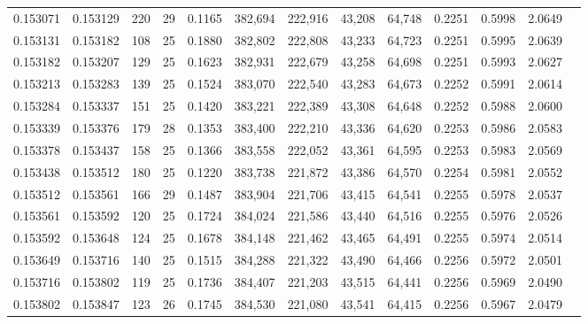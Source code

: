 \begin{tabular}{rrrrrrrrrrrrr}
0.153071 & 0.153129 & 220 &  29 &                                     0.1165 & 382,694 & 222,916 &  43,208 &  64,748 & 0.2251 & 0.5998 & 2.0649 \\
0.153131 & 0.153182 & 108 &  25 &                                     0.1880 & 382,802 & 222,808 &  43,233 &  64,723 & 0.2251 & 0.5995 & 2.0639 \\
0.153182 & 0.153207 & 129 &  25 &                                     0.1623 & 382,931 & 222,679 &  43,258 &  64,698 & 0.2251 & 0.5993 & 2.0627 \\
0.153213 & 0.153283 & 139 &  25 &                                     0.1524 & 383,070 & 222,540 &  43,283 &  64,673 & 0.2252 & 0.5991 & 2.0614 \\
0.153284 & 0.153337 & 151 &  25 &                                     0.1420 & 383,221 & 222,389 &  43,308 &  64,648 & 0.2252 & 0.5988 & 2.0600 \\
0.153339 & 0.153376 & 179 &  28 &                                     0.1353 & 383,400 & 222,210 &  43,336 &  64,620 & 0.2253 & 0.5986 & 2.0583 \\
0.153378 & 0.153437 & 158 &  25 &                                     0.1366 & 383,558 & 222,052 &  43,361 &  64,595 & 0.2253 & 0.5983 & 2.0569 \\
0.153438 & 0.153512 & 180 &  25 &                                     0.1220 & 383,738 & 221,872 &  43,386 &  64,570 & 0.2254 & 0.5981 & 2.0552 \\
0.153512 & 0.153561 & 166 &  29 &                                     0.1487 & 383,904 & 221,706 &  43,415 &  64,541 & 0.2255 & 0.5978 & 2.0537 \\
0.153561 & 0.153592 & 120 &  25 &                                     0.1724 & 384,024 & 221,586 &  43,440 &  64,516 & 0.2255 & 0.5976 & 2.0526 \\
0.153592 & 0.153648 & 124 &  25 &                                     0.1678 & 384,148 & 221,462 &  43,465 &  64,491 & 0.2255 & 0.5974 & 2.0514 \\
0.153649 & 0.153716 & 140 &  25 &                                     0.1515 & 384,288 & 221,322 &  43,490 &  64,466 & 0.2256 & 0.5972 & 2.0501 \\
0.153716 & 0.153802 & 119 &  25 &                                     0.1736 & 384,407 & 221,203 &  43,515 &  64,441 & 0.2256 & 0.5969 & 2.0490 \\
0.153802 & 0.153847 & 123 &  26 &                                     0.1745 & 384,530 & 221,080 &  43,541 &  64,415 & 0.2256 & 0.5967 & 2.0479 \\

\end{tabular}
